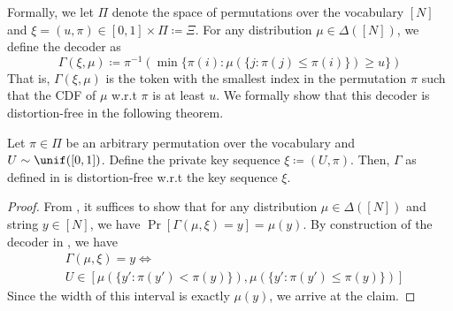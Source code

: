 Formally, we let $\Pi$ denote the space of permutations over the vocabulary $[N]$ and $\xi = (u, \pi) \in [0,1] \times \Pi \coloneqq \Xi$. For any distribution $\mu \in \Delta([N])$, we define the decoder as
%
\begin{equation}
    \Gamma(\xi, \mu) \coloneqq \pi^{-1} (\min \{ \pi(i): \mu( \{j: \pi(j) \leq \pi(i) \} ) \geq u \} )
    \label{eq:its-decoder}
\end{equation}
%
That is, $\Gamma(\xi, \mu)$ is the token with the smallest index in the permutation $\pi$ such that the CDF of $\mu$ w.r.t $\pi$ is at least $u$. We formally show that this decoder is distortion-free in the following theorem.
%
\begin{theorem}
    Let $\pi \in \Pi$ be an arbitrary permutation over the vocabulary and $U \sim \unif([0,1])$. Define the private key sequence $\xi \coloneqq (U, \pi)$. Then, $\Gamma$ as defined in  is distortion-free w.r.t the key sequence $\xi$. 
    \label{thm:distortion-free}
\end{theorem}
%
\begin{proof}
    From , it suffices to show that for any distribution $\mu \in \Delta([N])$ and string $y \in [N]$, we have $\Pr[\Gamma(\mu, \xi) = y] = \mu(y)$. By construction of the decoder in , we have 
    \begin{align*}
        &\Gamma(\mu, \xi) = y \iff \\
        &U \in [\mu(\{ y': \pi(y') < \pi(y)\}), \mu(\{ y': \pi(y') \leq \pi(y) \})]
    \end{align*}
    Since the width of this interval is exactly $\mu(y)$, we arrive at the claim.
\end{proof}
%

